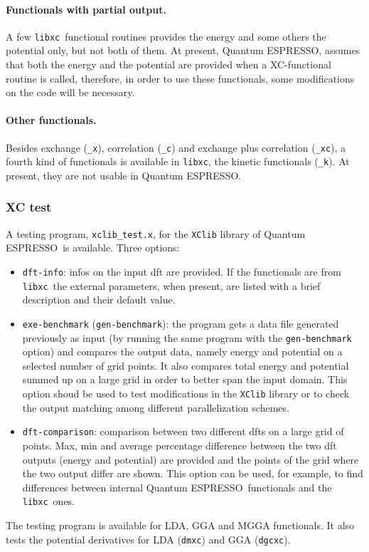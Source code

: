 \documentclass[12pt,a4paper]{article}
\def\qe{{\sc Quantum ESPRESSO}}
\def\libxc{\texttt{libxc}}
\begin{document}
\paragraph{Functionals with partial output.}
A few \libxc\ functional routines provides the energy and some others the potential only, but not both of them. At present, \qe, assumes that both the energy and the potential are provided when a XC-functional routine is called, therefore, in order to use these functionals, some modifications on the code will be necessary.
%
\paragraph{Other functionals.} Besides exchange (\texttt{\_x}), correlation (\texttt{\_c}) and exchange plus correlation (\texttt{\_xc}), a fourth kind of functionals is available in \libxc, the kinetic functionals (\texttt{\_k}). At present, they are not usable in \qe.
%
\subsubsection{XC test}
\label{SubSec:XCtest}
A testing program, \texttt{xclib\_test.x}, for the \texttt{XClib} library of \qe\ is available. Three options:
\begin{itemize}
	\item \texttt{dft-info}: infos on the input dft are provided. If the functionals are from \libxc\ the external parameters, when present, are listed with a brief description and their default value.
	\item \texttt{exe-benchmark} (\texttt{gen-benchmark}): the program gets a data file generated previously as input (by running the same program with the \texttt{gen-benchmark} option) and compares the output data, namely energy and potential on a selected number of grid points. It also compares total energy and potential summed up on a large grid in order to better span the input domain. This option shoud be used to test modifications in the \texttt{XClib} library or to check the output matching among different parallelization schemes.
	\item \texttt{dft-comparison}: comparison between two different dfts on a large grid of points. Max, min and average percentage difference between the two dft outputs (energy and potential) are provided and the points of the grid where the two output differ are shown. This option can be used, for example, to find differences between internal \qe\ functionals and the \libxc\ ones.
\end{itemize}
The testing program is available for LDA, GGA and MGGA functionals. It also tests the potential derivatives for LDA (\texttt{dmxc}) and GGA (\texttt{dgcxc}).
\end{document}
